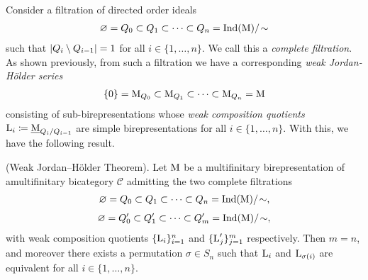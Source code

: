\noindent Consider a filtration of directed order ideals
\begin{align*}
\begin{split}
\varnothing = Q_0 \subset Q_1 \subset \cdots \subset Q_n = \textnormal{Ind}(\textnormal{M})/\!\sim
\end{split}
\end{align*}
\noindent such that $\lvert Q_i \setminus Q_{i-1}\rvert = 1$ for all $i \in \{1, \dots, n\}$. We call this a {\em complete filtration}. As shown previously, from such a filtration we have a corresponding {\em weak Jordan-H\"{o}lder series}
\begin{align*}
\begin{split}
\{0\} = \textnormal{M}_{Q_0} \subset \textnormal{M}_{Q_1} \subset \cdots \subset \textnormal{M}_{Q_n} = \textnormal{M}
\end{split}
\end{align*}
\noindent consisting of sub-birepresentations whose {\em weak composition quotients} $\textnormal{L}_i \coloneqq \underline{\textnormal{M}}_{Q_i/Q_{i-1}}$ are simple birepresentations for all $i \in \{1, \dots, n\}$. With this, we have the following result.\\

\noindent\begin{theorem}\textnormal{(Weak Jordan--H\"{o}lder Theorem).} Let $\textnormal{M}$ be a multifinitary birepresentation of a\linebreak multifinitary bicategory $\mathscr{C}$ admitting the two complete filtrations
\begin{align*}
\begin{split}
\varnothing = Q_0 \subset Q_1 \subset \cdots \subset Q_n = \textnormal{Ind}(\textnormal{M})/\!\sim,%
\end{split}
\end{align*}
\begin{align*}
\begin{split}
\varnothing = Q_0' \subset Q_1' \subset \cdots \subset Q_m' = \textnormal{Ind}(\textnormal{M})/\!\sim,
\end{split}
\end{align*}
\noindent with weak composition quotients $\{\textnormal{L}_i\}_{i=1}^n$ and $\{\textnormal{L}_j'\}_{j=1}^m$ respectively. Then $m = n$, and moreover there exists a permutation $\sigma \in S_n$ such that $\textnormal{L}_i$ and $\textnormal{L}_{\sigma(i)}$ are equivalent for all $i \in \{1, \dots, n\}$.\\
\end{theorem}

